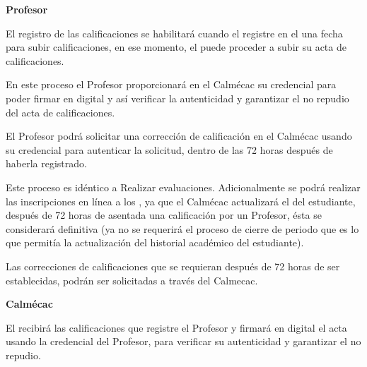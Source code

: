 \begin{PDescripcion}
    
    \Ppaso \textbf{Profesor}
    \begin{enumerate}
        \Ppaso[\PSubProceso] El registro de las calificaciones se habilitará cuando el  registre en el  una fecha para subir calificaciones, en ese momento, el  puede proceder a subir su acta de calificaciones.
        
        \Ppaso[\PSubProceso] En este proceso el Profesor proporcionará en el Calmécac su credencial para poder firmar en digital y así verificar la autenticidad y garantizar el no repudio del acta de calificaciones.
        
        \Ppaso[\PSubProceso] El Profesor podrá solicitar una corrección de calificación en el Calmécac usando su credencial para autenticar la solicitud, dentro de las 72 horas después de haberla registrado.
        
        \Ppaso[\PSubProceso] Este proceso es idéntico a Realizar evaluaciones. Adicionalmente se podrá realizar las inscripciones en línea a los , ya que el Calmécac actualizará el  del estudiante, después de 72 horas de asentada una calificación por un Profesor, ésta se considerará definitiva (ya no se requerirá el proceso de cierre de periodo que es lo que permitía la actualización del historial académico del estudiante).
        
        \Ppaso[\PSubProceso] Las correcciones de calificaciones que se requieran después de 72 horas de ser establecidas, podrán ser solicitadas a través del Calmecac.
        
    \end{enumerate}    
    \Ppaso \textbf{Calmécac}
    \begin{enumerate}
        \Ppaso[\PSubProceso] El  recibirá las calificaciones que registre el Profesor y firmará en digital el acta usando la credencial del Profesor, para verificar su autenticidad y garantizar el no repudio.
        

\end{enumerate}
\end{PDescripcion}
